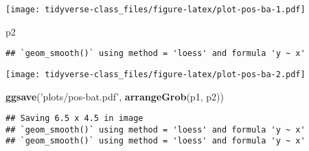 \documentclass[]{book}
\newenvironment{Shaded}{\begin{snugshade}}{\end{snugshade}}
\newcommand{\KeywordTok}[1]{\textcolor[rgb]{0.13,0.29,0.53}{\textbf{#1}}}
\newcommand{\StringTok}[1]{\textcolor[rgb]{0.31,0.60,0.02}{#1}}
\newcommand{\NormalTok}[1]{#1}
\begin{document}
\texttt{[image: tidyverse-class\_files/figure-latex/plot-pos-ba-1.pdf]}

\begin{Shaded}
\begin{Highlighting}[]
\NormalTok{p2}
\end{Highlighting}
\end{Shaded}

\begin{verbatim}
## `geom_smooth()` using method = 'loess' and formula 'y ~ x'
\end{verbatim}

\texttt{[image: tidyverse-class\_files/figure-latex/plot-pos-ba-2.pdf]}

\begin{Shaded}
\begin{Highlighting}[]
\KeywordTok{ggsave}\NormalTok{(}\StringTok{'plots/pos-bat.pdf'}\NormalTok{, }\KeywordTok{arrangeGrob}\NormalTok{(p1, p2))}
\end{Highlighting}
\end{Shaded}

\begin{verbatim}
## Saving 6.5 x 4.5 in image
## `geom_smooth()` using method = 'loess' and formula 'y ~ x'
## `geom_smooth()` using method = 'loess' and formula 'y ~ x'
\end{verbatim}


\end{document}
